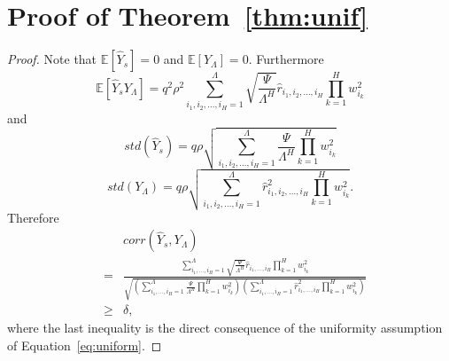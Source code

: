 \documentclass[twoside]{article}
\begin{document}
\section{Proof of Theorem~\ref{thm:unif}}
\begin{proof}
Note that $\mathbb{E}[\hat{Y}_s] = 0$ and $\mathbb{E}[Y_{\Lambda}] = 0$. Furthermore
\[\mathbb{E}[\hat{Y}_sY_{\Lambda}] = q^2\rho^2\sum_{i_1,i_2,\dots,i_H=1}^{\Lambda}\sqrt{\frac{\Psi}{\Lambda^H}}\hat{r}_{i_1,i_2,\dots,i_H}\prod_{k = 1}^{H}w_{i_k}^2
\]
and
\[std(\hat{Y}_s) = q\rho\sqrt{\sum_{i_1,i_2,\dots,i_H=1}^{\Lambda}\frac{\Psi}{\Lambda^H}\prod_{k = 1}^{H}w_{i_k}^2}
\]
\[std(Y_{\Lambda}) = q\rho\sqrt{\sum_{i_1,i_2,\dots,i_H=1}^{\Lambda}\hat{r}_{i_1,i_2,\dots,i_H}^2\prod_{k = 1}^{H}w_{i_k}^2}.
\]
Therefore
\begin{eqnarray*}
&&\!\!\!\!\!\!\!\!\!corr(\hat{Y}_s,Y_{\Lambda})\\ 
&\!\!\!\!\!\!\!\!\!=&\!\!\!\!\!\!\! \frac{\displaystyle\sum_{i_1,\dots,i_H=1}^{\Lambda}\sqrt{\frac{\Psi}{\Lambda^H}}\hat{r}_{i_1,\dots,i_H}\prod_{k = 1}^{H}w_{i_k}^2}{\sqrt{\!\!\!\left(\displaystyle\sum_{i_1,\dots,i_H=1}^{\Lambda}\frac{\Psi}{\Lambda^H}\prod_{k = 1}^{H}w_{i_k}^2\right)\!\!\!\!\left(\displaystyle\sum_{i_1,\dots,i_H=1}^{\Lambda}\!\!\!\!\!\hat{r}_{i_1,\dots,i_H}^2\prod_{k = 1}^{H}w_{i_k}^2\right)}}\\
&\!\!\!\!\!\!\!\!\geq& \delta, 
\end{eqnarray*}
where the last inequality is the direct consequence of the uniformity assumption of Equation~\ref{eq:uniform}.
\end{proof}
\end{document}
